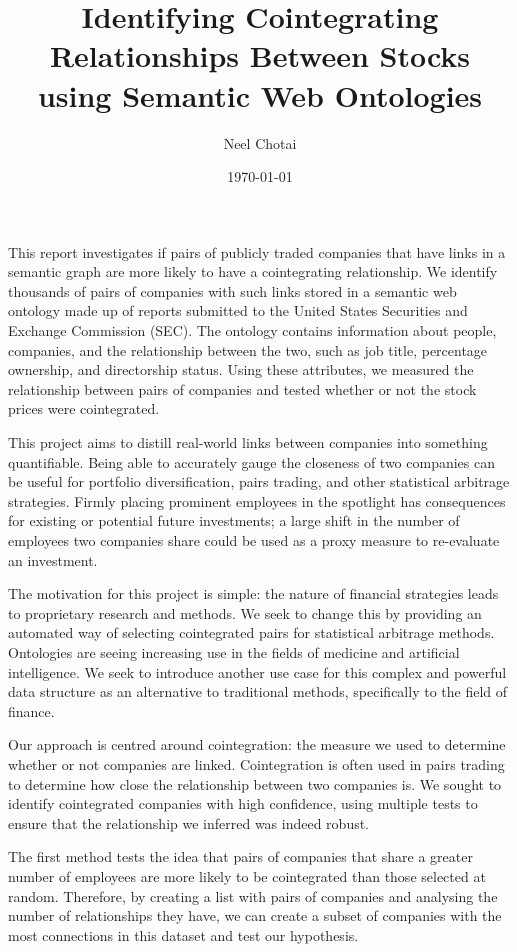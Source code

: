\documentclass{UoYCSproject}
\author{Neel Chotai}
\title{Identifying Cointegrating Relationships Between Stocks using Semantic Web Ontologies}
\date{\today}
\begin{document}
\maketitle
\listoffigures
\listoftables

\begin{summary}
This report investigates if pairs of publicly traded companies that have links in a semantic graph are more likely to have a cointegrating relationship. We identify thousands of pairs of companies with such links stored in a semantic web ontology made up of reports submitted to the United States Securities and Exchange Commission (SEC). The ontology contains information about people, companies, and the relationship between the two, such as job title, percentage ownership, and directorship status. Using these attributes, we measured the relationship between pairs of companies and tested whether or not the stock prices were cointegrated.

This project aims to distill real-world links between companies into something quantifiable. Being able to accurately gauge the closeness of two companies can be useful for portfolio diversification, pairs trading, and other statistical arbitrage strategies. Firmly placing prominent employees in the spotlight has consequences for existing or potential future investments; a large shift in the number of employees two companies share could be used as a proxy measure to re-evaluate an investment.

The motivation for this project is simple: the nature of financial strategies leads to proprietary research and methods. We seek to change this by providing an automated way of selecting cointegrated pairs for statistical arbitrage methods. Ontologies are seeing increasing use in the fields of medicine and artificial intelligence. We seek to introduce another use case for this complex and powerful data structure as an alternative to traditional methods, specifically to the field of finance.

Our approach is centred around cointegration: the measure we used to determine whether or not companies are linked. Cointegration is often used in pairs trading to determine how close the relationship between two companies is. We sought to identify cointegrated companies with high confidence, using multiple tests to ensure that the relationship we inferred was indeed robust.

The first method tests the idea that pairs of companies that share a greater number of employees are more likely to be cointegrated than those selected at random. Therefore, by creating a list with pairs of companies and analysing the number of relationships they have, we can create a subset of companies with the most connections in this dataset and test our hypothesis.


\end{summary}
\end{document}
